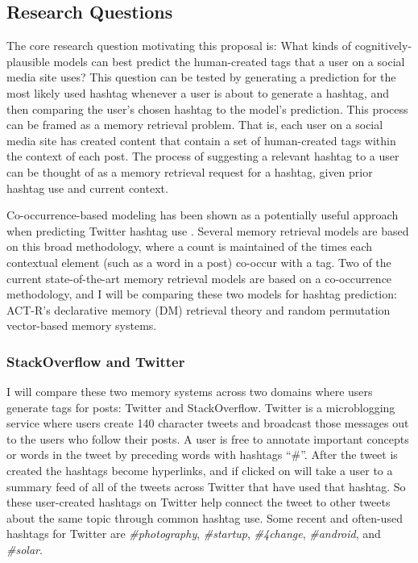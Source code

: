 \documentclass[man,floatsintext,donotrepeattitle]{apa6}
\begin{document}
\subsection{Research Questions}

The core research question motivating this proposal is:
What kinds of cognitively-plausible models can best predict the human-created tags that a user on a social media site uses?
This question can be tested by generating a prediction for the most likely used hashtag whenever a user is about to generate a hashtag, and then comparing the user's chosen hashtag to the model's prediction.
This process can be framed as a memory retrieval problem.
That is, each user on a social media site has created content that contain a set of human-created tags within the context of each post.
The process of suggesting a relevant hashtag to a user can be thought of as a memory retrieval request for a hashtag, given prior hashtag use and current context.

Co-occurrence-based modeling has been shown as a potentially useful approach when predicting Twitter hashtag use \parencite{Efron2010}.
Several memory retrieval models are based on this broad methodology, where a count is maintained of the times each contextual element (such as a word in a post) co-occur with a tag.
Two of the current state-of-the-art memory retrieval models are based on a co-occurrence methodology, and I will be comparing these two models for hashtag prediction:
ACT-R's declarative memory (DM) retrieval theory and random permutation vector-based memory systems.

\subsubsection{StackOverflow and Twitter}

I will compare these two memory systems across two domains where users generate tags for posts: Twitter and StackOverflow.
Twitter is a microblogging service where users create 140 character tweets and broadcast those messages out to the users who follow their posts.
A user is free to annotate important concepts or words in the tweet by preceding words with hashtags ``\#''.
After the tweet is created the hashtags become hyperlinks, and if clicked on will take a user to a summary feed of all of the tweets across Twitter that have used that hashtag.
So these user-created hashtags on Twitter help connect the tweet to other tweets about the same topic through common hashtag use.
Some recent and often-used hashtags for Twitter are \emph{\#photography}, \emph{\#startup}, \emph{\#4change}, \emph{\#android}, and \emph{\#solar}.
\end{document}
